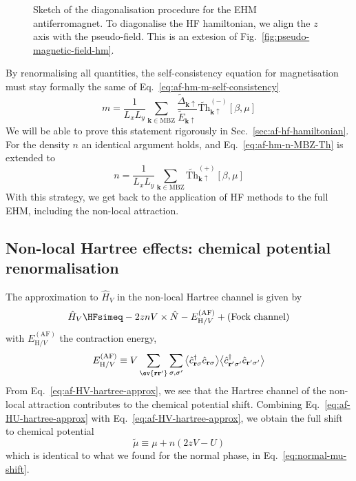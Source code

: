 \begin{figure}
	\centering
	
	\caption{Sketch of the diagonalisation procedure for the EHM antiferromagnet. To diagonalise the HF hamiltonian, we align the $z$ axis with the pseudo-field. This is an extesion of Fig.~\ref{fig:pseudo-magnetic-field-hm}.}
	\label{fig:pseudo-magnetic-field-ehm}
\end{figure}

By renormalising all quantities, the self-consistency equation for magnetisation must stay formally the same of Eq.~\eqref{eq:af-hm-m-self-consistency}
\begin{equation}\label{eq:af-ehm-m-self-consistency}
	m = \frac{1}{L_x L_y} \sum_{\mathbf{k} \in \mathrm{MBZ}} \frac{\tilde{\Delta}_{\mathbf{k}\uparrow}}{\tilde{E}_{\mathbf{k}\uparrow}} \tilde{\mathrm{Th}}_{\mathbf{k}\uparrow}^{(-)}[\beta,\mu] 
\end{equation}
We will be able to prove this statement rigorously in Sec.~\ref{sec:af-hf-hamiltonian}. For the density $n$ an identical argument holds, and Eq.~\eqref{eq:af-hm-n-MBZ-Th} is extended to
\begin{equation}\label{eq:af-ehm-n-MBZ-Th}
	n = \frac{1}{L_x L_y} \sum_{\mathbf{k} \in \mathrm{MBZ}} \tilde{\mathrm{Th}}_{\mathbf{k}\uparrow}^{(+)}[\beta,\mu]
\end{equation}
With this strategy, we get back to the application of HF methods to the full EHM, including the non-local attraction.

\subsection{Non-local Hartree effects: chemical potential renormalisation}\label{subsec:af-hartree-mu}

The approximation to $\hat H_V$ in the non-local Hartree channel is given by
\begin{equation}\label{eq:af-HV-hartree-approx}
	\hat H_V \HFsimeq -2znV \times \hat N - E_{\mathrm{H}/V}^{(\mathrm{AF})} + (\text{Fock channel})
\end{equation}
with $E_{\mathrm{H}/V}^{(\mathrm{AF})}$ the contraction energy,
\begin{equation}\label{eq:af-HV-hartree-Ec-implicit}
	E_{\mathrm{H}/V}^{(\mathrm{AF})} \equiv V \sum_{\ev{\mathbf{r}\mathbf{r}'}} \sum_{\sigma,\sigma'} \big\langle \hat c_{\mathbf{r}\sigma}^\dagger \hat c_{\mathbf{r}\sigma} \big\rangle  \big\langle \hat c_{\mathbf{r}'\sigma'}^\dagger \hat c_{\mathbf{r}'\sigma'} \big\rangle
\end{equation}
From Eq.~\eqref{eq:af-HV-hartree-approx}, we see that the Hartree channel of the non-local attraction contributes to the chemical potential shift. Combining Eq.~\eqref{eq:af-HU-hartree-approx} with Eq.~\eqref{eq:af-HV-hartree-approx}, we obtain the full shift to chemical potential
\begin{equation}\label{eq:af-nl-mu}
	\tilde{\mu} \equiv \mu + n(2zV-U)
\end{equation}
which is identical to what we found for the normal phase, in Eq.~\eqref{eq:normal-mu-shift}.

